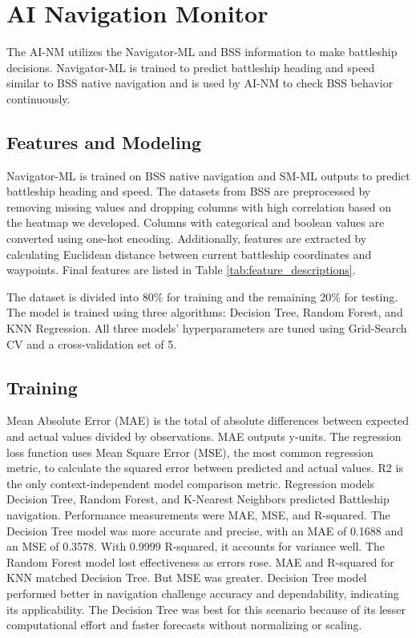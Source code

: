 \documentclass[conference]{IEEEtran}
\begin{document}
\section{AI Navigation Monitor}
The AI-NM utilizes the Navigator-ML and BSS information to make battleship decisions. Navigator-ML is trained to predict battleship heading and speed similar to BSS native navigation and is used by AI-NM to check BSS behavior continuously.
\subsection{Features and Modeling}
Navigator-ML is trained on BSS native navigation and SM-ML outputs to predict battleship heading and speed. The datasets from BSS are preprocessed by removing missing values and dropping columns with high correlation based on the heatmap we developed. Columns with categorical and boolean values are converted using one-hot encoding. Additionally, features are extracted by calculating Euclidean distance between current battleship coordinates and waypoints. Final features are listed in Table \ref{tab:feature_descriptions}.

The dataset is divided into 80\% for training and the remaining 20\% for testing. The model is trained using three algorithms: Decision Tree, Random Forest, and KNN Regression. All three models' hyperparameters are tuned using Grid-Search CV and a cross-validation set of 5. 

\subsection{Training}
Mean Absolute Error (MAE) is the total of absolute differences between expected and actual values divided by observations. MAE outputs y-units. The regression loss function uses Mean Square Error (MSE), the most common regression metric, to calculate the squared error between predicted and actual values. R2 is the only context-independent model comparison metric. 
Regression models Decision Tree, Random Forest, and K-Nearest Neighbors predicted Battleship navigation. Performance measurements were MAE, MSE, and R-squared. The Decision Tree model was more accurate and precise, with an MAE of 0.1688 and an MSE of 0.3578. With 0.9999 R-squared, it accounts for variance well. The Random Forest model lost effectiveness as errors rose. MAE and R-squared for KNN matched Decision Tree. But MSE was greater. Decision Tree model performed better in navigation challenge accuracy and dependability, indicating its applicability. The Decision Tree was best for this scenario because of its lesser computational effort and faster forecasts without normalizing or scaling. 
\end{document}
